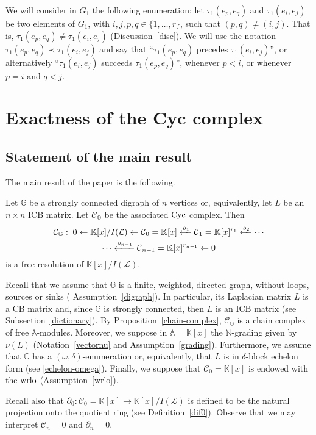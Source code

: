 \documentclass[ALCO]{cedram}
\newcommand{\mbn}{\mbox{$\mathbb{N}$}}
\newcommand{\mbk}{\mbox{$\mathbb{K}$}}
\newcommand{\mba}{\mbox{$\mathbb{A}$}}
\newcommand{\mbg}{\mbox{$\mathbb{G}$}}
\newcommand{\mcc}{\mbox{$\mathcal{C}$}}
\newcommand{\mcl}{\mbox{$\mathcal{L}$}}
\newcommand{\icb}{\mbox{$\mathrm{ICB}$}}
\newcommand{\cb}{\mbox{$\mathrm{CB}$}}
\newcommand{\dif}{\mbox{$\partial$}}
\newcommand{\sdif}{\mbox{\tiny $\partial$}}
\newcommand{\cyc}{\mbox{${\rm Cyc}$}}
\newcommand{\wrlo}{\mbox{${\rm wrlo}$}}
\begin{document}
\begin{remark}\label{induced-srle}
We will consider in $G_1$ the following enumeration: let
$\tau_1(e_p,e_q)$ and $\tau_1(e_i,e_j)$ be two elements of $G_1$, with
$i,j,p,q\in\{1,\ldots ,r\}$, such that $(p,q)\neq (i,j)$. That is,
$\tau_1(e_p,e_q)\neq\tau_1(e_i,e_j)$ (\cf Discussion~\ref{disc}).  We
will use the notation $\tau_1(e_p,e_q)\prec \tau_1(e_i,e_j)$ and say
that ``$\tau_1(e_p,e_q)$ precedes $\tau_1(e_i,e_j)$'', or
alternatively ``$\tau_1(e_i,e_j)$ succeeds $\tau_1(e_p,e_q)$'',
whenever $p<i$, or whenever $p=i$ and $q<j$.
\end{remark}

\section{Exactness of the Cyc complex}

\subsection{Statement of the main result}

The main result of the paper is the following.

\begin{theorem}\label{main}
Let $\mbg$ be a strongly connected digraph of $n$ vertices or,
equivalently, let $L$ be an $n\times n$ $\icb$ matrix. Let
$\mcc_{\mathbb{G}}$ be the associated $\cyc$ complex. Then
\begin{multline*}
\mcc_{\mathbb{G}}:\; 0\leftarrow \mbk[x]/I(\mcl)\leftarrow
\mcc_0=\mbk[x]\xleftarrow{\sdif_1} \mcc_1=\mbk[x]^{r_1}
\xleftarrow{\sdif_2} \cdots \\ \cdots
\xleftarrow{\sdif_{n-1}}\mcc_{n-1}=\mbk[x]^{r_{n-1}}\xleftarrow{} 0
\end{multline*}
is a free resolution of $\mbk[x]/I(\mcl)$.
\end{theorem}

\begin{remark}
Recall that we assume that $\mbg$ is a finite, weighted, directed
graph, without loops, sources or sinks (\cf
Assumption~\ref{digraph}). In particular, its Laplacian matrix $L$ is
a $\cb$ matrix and, since $\mbg$ is strongly connected, then $L$ is an
$\icb$ matrix (see Subsection~\ref{dictionary}). By
Proposition~\ref{chain-complex}, $\mcc_{\mathbb{G}}$ is a chain
complex of free $\mba$-modules. Moreover, we suppose in $\mba=\mbk[x]$
the $\mbn$-grading given by $\nu(L)$ (\cf Notation~\ref{vectornu} and
Assumption~\ref{grading}). Furthermore, we assume that $\mbg$ has a
$(\omega,\delta)$-enumeration or, equivalently, that $L$ is in
$\delta$-block echelon form (see \ref{echelon-omega}). Finally, we
suppose that $\mcc_0=\mbk[x]$ is endowed with the $\wrlo$
(Assumption~\ref{wrlo}).

Recall also that $\dif_0:\mcc_0=\mbk[x]\to \mbk[x]/I(\mcl)$ is defined
to be the natural projection onto the quotient ring (see
Definition~\ref{dif0}). Observe that we may interpret $\mcc_n=0$ and
$\dif_n=0$.
\end{remark}
\end{document}
